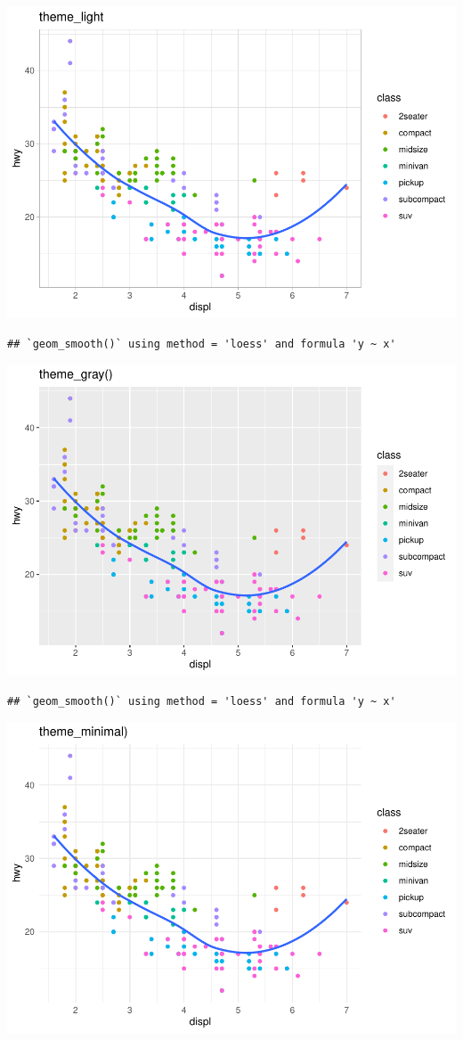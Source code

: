 \documentclass[
]{article}
\begin{document}
\includegraphics{rmarkdown_tutorial_files/figure-latex/unnamed-chunk-32-4.pdf}

\begin{verbatim}
## `geom_smooth()` using method = 'loess' and formula 'y ~ x'
\end{verbatim}

\includegraphics{rmarkdown_tutorial_files/figure-latex/unnamed-chunk-32-5.pdf}

\begin{verbatim}
## `geom_smooth()` using method = 'loess' and formula 'y ~ x'
\end{verbatim}

\includegraphics{rmarkdown_tutorial_files/figure-latex/unnamed-chunk-32-6.pdf}
\end{document}
